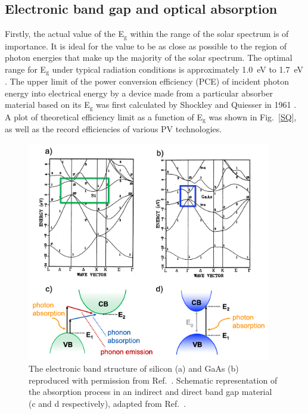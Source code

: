\documentclass[11pt, twoside]{report}
\begin{document}
\subsection{Electronic band gap and optical absorption}

Firstly, the actual value of the E$_\mathrm{g}$ within the range of the solar spectrum is of importance. It is ideal for the value to be as close as possible to the region of photon energies that make up the majority of the solar spectrum. The optimal range for E$_\mathrm{g}$ under typical radiation conditions is approximately \SI{1.0}{eV} to \SI{1.7}{eV} \cite{PV_E_range}. The upper limit of the power conversion efficiency (PCE) of incident photon energy into electrical energy by a device made from a particular absorber material based on its E$_\mathrm{g}$ was first calculated by Shockley and Quiesser in 1961 \cite{SQ_1961}. A plot of theoretical efficiency limit as a function of E$_\mathrm{g}$ was shown in Fig.~\ref{SQ}, as well as the record efficiencies of various PV technologies.

\begin{figure}[h!]
  \centering
    \includegraphics[width=0.95\textwidth]{figures/new_Si_and_GaAs.png}
    \caption[The electronic band structure of silicon (a) and GaAs (b). Schematic representation of the absorption process in an indirect and direct band gap material (c and d respectively) (c and d respectively).]{The electronic band structure of silicon (a) and GaAs (b) reproduced with permission from Ref.~. Schematic representation of the absorption process in an indirect and direct band gap material (c and d respectively), adapted from Ref.~.}
  \label{Si_and_GaAs}
\end{figure}
\end{document}
